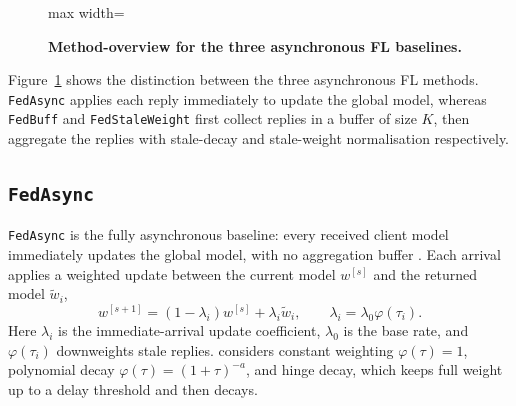 \begin{figure}[H]
\begin{adjustbox}{max width=\textwidth}
\end{adjustbox}
\caption{\textbf{Method-overview for the three asynchronous FL baselines.}}
\label{fig:async_method_overview}
\end{figure}

Figure~\ref{fig:async_method_overview} shows the distinction between the three asynchronous FL methods. \texttt{FedAsync} applies each reply immediately to update the global model, whereas \texttt{FedBuff} and \texttt{FedStaleWeight} first collect replies in a buffer of size \(K\), then aggregate the replies with stale-decay and stale-weight normalisation respectively.



\subsection{\texttt{FedAsync}}
\label{sec:fedasync_related}

\texttt{FedAsync} is the fully asynchronous baseline: every received client model immediately updates the global model, with no aggregation buffer \parencite{xie2019asynchronous}. Each arrival applies a weighted update between the current model \(w^{[s]}\) and the returned model \(\tilde{w}_i\),
\[
    w^{[s+1]}
    =
    (1-\lambda_i) w^{[s]} + \lambda_i \tilde{w}_i,
    \qquad
    \lambda_i = \lambda_0 \varphi(\tau_i).
\]
Here \(\lambda_i\) is the immediate-arrival update coefficient, \(\lambda_0\) is the base rate, and \(\varphi(\tau_i)\) downweights stale replies. \cite{xie2019asynchronous} considers constant weighting \(\varphi(\tau)=1\), polynomial decay \(\varphi(\tau)=(1 + \tau)^{-a}\), and hinge decay, which keeps full weight up to a delay threshold and then decays.

